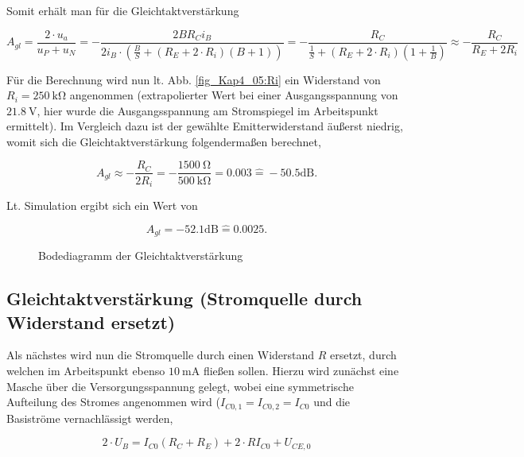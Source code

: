 Somit erhält man für die Gleichtaktverstärkung

\begin{equation}
    A_{gl} = \frac{2 \cdot u_a}{u_P + u_N} = -\frac{2BR_Ci_B}{2 i_B \cdot \left( \frac{B}{S} + (R_E + 2 \cdot R_i)(B+1) \right)} = - \frac{R_C}{\frac{1}{S} + (R_E + 2 \cdot R_i)(1+\frac{1}{B})} \approx -\frac{R_C}{R_E + 2R_i}
\end{equation}

Für die Berechnung wird nun lt. Abb. \ref{fig_Kap4_05:Ri} ein Widerstand von $R_i = \SI{250}{\kilo\ohm}$ angenommen (extrapolierter Wert bei einer Ausgangsspannung von $\SI{21,8}{\volt}$, hier wurde die Ausgangsspannung am Stromspiegel im Arbeitspunkt ermittelt). Im Vergleich dazu ist der gewählte Emitterwiderstand äußerst niedrig, womit sich die Gleichtaktverstärkung folgendermaßen berechnet, 

\begin{equation}
    A_{gl} \approx -\frac{R_C}{2R_i} = -\frac{\SI{1500}{\ohm}}{\SI{500}{\kilo\ohm}} = 0.003 \hat{=} -50.5 \text{dB} .
\end{equation}

Lt. Simulation ergibt sich ein Wert von 

\begin{equation}
    A_{gl} =-52.1 \text{dB} \hat{=} 0.0025 .
\end{equation}

\begin{figure}[H]
	\centering \small
	\scalebox{0.9}{}
	\caption{Bodediagramm der Gleichtaktverstärkung}
	\label{fig_Kap5_05:Bode}
\end{figure}

\subsection{Gleichtaktverstärkung (Stromquelle durch Widerstand ersetzt)}
Als nächstes wird nun die Stromquelle durch einen Widerstand $R$ ersetzt, durch welchen im Arbeitspunkt ebenso $\SI{10}{\milli\ampere}$ fließen sollen. Hierzu wird zunächst eine Masche über die Versorgungsspannung gelegt, wobei eine symmetrische Aufteilung des Stromes angenommen wird ($I_{C0,1} = I_{C0,2} = I_{C0}$ und die Basiströme vernachlässigt werden,

\begin{equation}
    2\cdot U_B = I_{C0} (R_C + R_E) + 2 \cdot RI_{C0} + U_{CE,0}
\end{equation}

